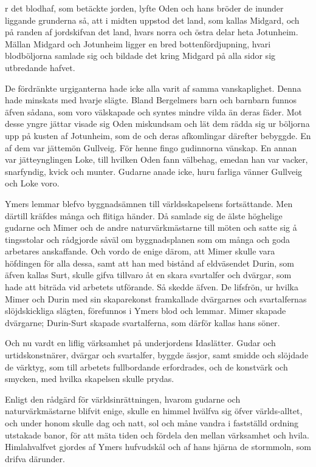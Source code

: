 \endSecII


\dropcapU r det blodhaf, som betäckte jorden, lyfte Oden och hans bröder de
inunder liggande grunderna så, att i midten uppstod det land, som kallas
Midgard, och på randen af jordskifvan det land, hvars norra och östra
delar heta Jotunheim. Mällan Midgard och Jotunheim ligger en bred
bottenfördjupning, hvari blodböljorna samlade sig och bildade det kring
Midgard på alla sidor sig utbredande hafvet.

De fördränkte urgiganterna hade icke alla varit af samma vanskaplighet.
Denna hade minskats med hvarje slägte. Bland Bergelmers barn och
barnbarn funnos äfven sådana, som voro välskapade och syntes mindre
vilda än deras fäder. Mot desse yngre jättar visade sig Oden miskundsam
och lät dem rädda sig ur böljorna upp på kusten af Jotunheim, som de och
deras afkomlingar därefter bebyggde. En af dem var jättemön Gullveig.
För henne fingo gudinnorna vänskap. En annan var jätteynglingen Loke,
till hvilken Oden fann välbehag, emedan han var vacker, snarfyndig,
kvick och munter. Gudarne anade icke, huru farliga vänner Gullveig och
Loke voro.

Ymers lemmar blefvo byggnadsämnen till världsskapelsens fortsättande.
Men därtill kräfdes många och flitiga händer. Då samlade sig de älste
höghelige gudarne och Mimer och de andre naturvärkmästarne till möten
och satte sig å tingsstolar och rådgjorde såväl om byggnadsplanen som om
många och goda arbetares anskaffande. Och vordo de enige därom, att
Mimer skulle vara höfdingen för alla dessa, samt att han med bistånd af
eldväsendet Durin, som äfven kallas Surt, skulle gifva tillvaro åt en
skara svartalfer och dvärgar,
som hade att biträda vid arbetets utförande. Så skedde äfven. De
lifsfrön, ur hvilka Mimer och Durin med sin skaparekonst framkallade
dvärgarnes och svartalfernas slöjdskickliga slägten, förefunnos i Ymers
blod och lemmar. Mimer skapade dvärgarne; Durin-Surt skapade
svartalferna, som därför kallas hans söner.

Och nu vardt en liflig värksamhet på underjordens Idaslätter. Gudar och
urtidskonstnärer, dvärgar och svartalfer, byggde ässjor, samt smidde och
slöjdade de värktyg, som till arbetets fullbordande erfordrades, och de
konstvärk och smycken, med hvilka skapelsen skulle prydas.

Enligt den rådgärd för världsinrättningen, hvarom gudarne och
naturvärkmästarne blifvit enige, skulle en himmel hvälfva sig öfver
världs-alltet, och under honom skulle dag och natt, sol och måne vandra
i fastställd ordning utstakade banor, för att mäta tiden och fördela den
mellan värksamhet och hvila. Himlahvalfvet gjordes af Ymers hufvudskål
och af hans hjärna de stormmoln, som drifva därunder.

